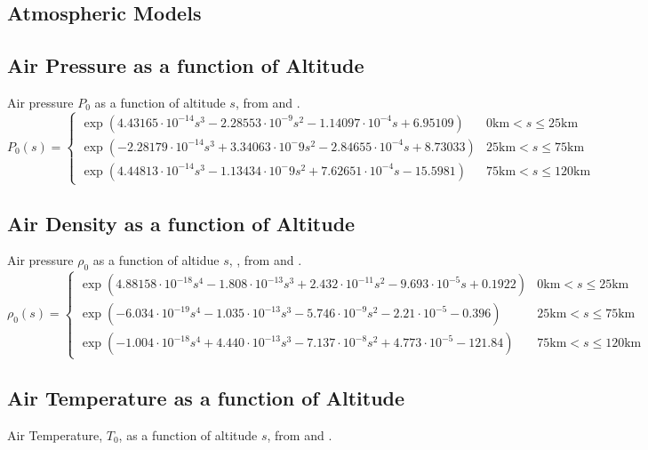\documentclass[twocolumn]{article}
\begin{document}
    \onecolumn
    \begin{appendices}
        \section{Atmospheric Models}
            \label{appendix:a}
            \subsection{Air Pressure as a function of Altitude}
                Air pressure $P_0$ as a function of altitude $s$, from \cite{Hans:Aero} and \cite{US:Aero}.
                    \[P_0(s)=\begin{cases}
                    \exp{\left(4.43165\cdot10^{-14}s^3-2.28553\cdot10^{-9}s^2-1.14097\cdot10^{-4}s+6.95109\right)} & 0\textrm{km}<s\leq 25\textrm{km}\\
                    \exp{\left(-2.28179\cdot10^{-14}s^3+3.34063\cdot10^-9s^2-2.84655\cdot10^{-4}s+8.73033\right)} & 25\textrm{km} < s \leq 75\textrm{km}\\
                    \exp{\left(4.44813\cdot10^{-14}s^3-1.13434\cdot10^-9s^2+7.62651\cdot10^{-4}s-15.5981\right)} & 75\textrm{km} < s \leq 120\textrm{km}
                \end{cases}\]
            \subsection{Air Density as a function of Altitude}
                Air pressure $\rho_0$ as a function of altidue $s$, , from \cite{Hans:Aero} and \cite{US:Aero}.
                \[\rho_0(s)=\begin{cases}
                    \exp{\left(4.88158\cdot10^{-18}s^4-1.808\cdot10^{-13}s^3+2.432\cdot10^{-11}s^2-9.693\cdot10^{-5}s+0.1922\right)} &  0\textrm{km}<s\leq 25\textrm{km}\\
                    \exp{\left(-6.034\cdot10^{-19}s^4-1.035\cdot10^{-13}s^3-5.746\cdot10^{-9}s^2-2.21\cdot10^{-5}-0.396\right)} &  25\textrm{km}<s\leq 75\textrm{km}\\
                    \exp{\left(-1.004\cdot10^{-18}s^4+4.440\cdot10^{-13}s^3-7.137\cdot10^{-8}s^2+4.773\cdot10^{-5}-121.84\right)} &  75\textrm{km}<s\leq 120\textrm{km}
                \end{cases}\]
            \subsection{Air Temperature as a function of Altitude}
                Air Temperature, $T_0$, as a function of altitude $s$, from \cite{Hans:Aero} and \cite{US:Aero}.


\end{appendices}
\end{document}
